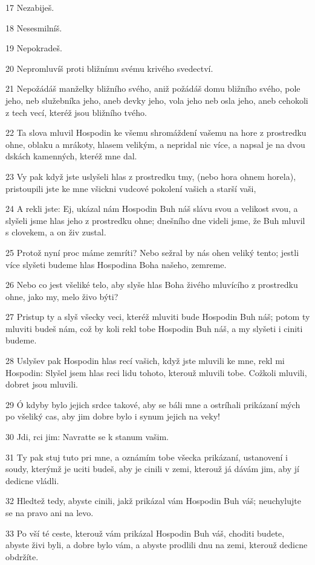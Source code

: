 \par 17 Nezabiješ.
\par 18 Nesesmilníš.
\par 19 Nepokradeš.
\par 20 Nepromluvíš proti bližnímu svému krivého svedectví.
\par 21 Nepožádáš manželky bližního svého, aniž požádáš domu bližního svého, pole jeho, neb služebníka jeho, aneb devky jeho, vola jeho neb osla jeho, aneb cehokoli z tech vecí, kteréž jsou bližního tvého.
\par 22 Ta slova mluvil Hospodin ke všemu shromáždení vašemu na hore z prostredku ohne, oblaku a mrákoty, hlasem velikým, a nepridal nic více, a napsal je na dvou dskách kamenných, kteréž mne dal.
\par 23 Vy pak když jste uslyšeli hlas z prostredku tmy, (nebo hora ohnem horela), pristoupili jste ke mne všickni vudcové pokolení vašich a starší vaši,
\par 24 A rekli jste: Ej, ukázal nám Hospodin Buh náš slávu svou a velikost svou, a slyšeli jsme hlas jeho z prostredku ohne; dnešního dne videli jsme, že Buh mluvil s clovekem, a on živ zustal.
\par 25 Protož nyní proc máme zemríti? Nebo sežral by nás ohen veliký tento; jestli více slyšeti budeme hlas Hospodina Boha našeho, zemreme.
\par 26 Nebo co jest všeliké telo, aby slyše hlas Boha živého mluvícího z prostredku ohne, jako my, melo živo býti?
\par 27 Pristup ty a slyš všecky veci, kteréž mluviti bude Hospodin Buh náš; potom ty mluviti budeš nám, což by koli rekl tobe Hospodin Buh náš, a my slyšeti i ciniti budeme.
\par 28 Uslyšev pak Hospodin hlas recí vašich, když jste mluvili ke mne, rekl mi Hospodin: Slyšel jsem hlas reci lidu tohoto, kterouž mluvili tobe. Cožkoli mluvili, dobret jsou mluvili.
\par 29 Ó kdyby bylo jejich srdce takové, aby se báli mne a ostríhali prikázaní mých po všeliký cas, aby jim dobre bylo i synum jejich na veky!
\par 30 Jdi, rci jim: Navratte se k stanum vašim.
\par 31 Ty pak stuj tuto pri mne, a oznámím tobe všecka prikázaní, ustanovení i soudy, kterýmž je uciti budeš, aby je cinili v zemi, kterouž já dávám jim, aby jí dedicne vládli.
\par 32 Hledtež tedy, abyste cinili, jakž prikázal vám Hospodin Buh váš; neuchylujte se na pravo ani na levo.
\par 33 Po vší té ceste, kterouž vám prikázal Hospodin Buh váš, choditi budete, abyste živi byli, a dobre bylo vám, a abyste prodlili dnu na zemi, kterouž dedicne obdržíte.

